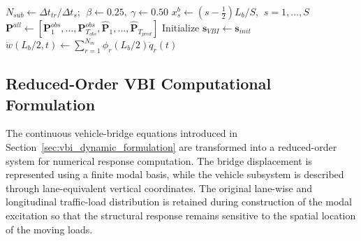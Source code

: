 \documentclass[journal]{IEEEtran}
\begin{document}
\begin{algorithm}[!htbp]
\caption{Multirate Traffic-to-Structure VBI Response Computation}
\label{alg:vbi_response}
\scriptsize
{}
$N_{sub}\leftarrow\Delta t_{tr}/\Delta t_s$;
$\;\beta\leftarrow0.25,\ \gamma\leftarrow0.50$\;
$x_s^b\leftarrow(s-\frac{1}{2})L_b/S$,
$\ s=1,\ldots,S$\;
$\mathbf{P}^{all}\leftarrow[
\mathbf{P}^{obs}_1,\ldots,\mathbf{P}^{obs}_{T_{obs}},
\widehat{\mathbf{P}}_1,\ldots,\widehat{\mathbf{P}}_{T_{pred}}]$\;
Initialize $\mathbf{s}_{VBI}\leftarrow\mathbf{s}_{init}$\;
$\ddot w(L_b/2,t)\leftarrow
\sum_{r=1}^{N_m}\phi_r(L_b/2)\ddot q_r(t)$\;
\;
\end{algorithm}

\subsection{Reduced-Order VBI Computational Formulation}
\label{sec:reduced_vbi}

The continuous vehicle-bridge
equations introduced in Section~\ref{sec:vbi_dynamic_formulation} are transformed into a reduced-order system
for numerical response computation. The bridge displacement is represented
using a finite modal basis, while the vehicle subsystem is described through
lane-equivalent vertical coordinates. The original lane-wise and longitudinal
traffic-load distribution is retained during construction of the modal
excitation so that the structural response remains sensitive to the spatial
location of the moving loads.
\end{document}
